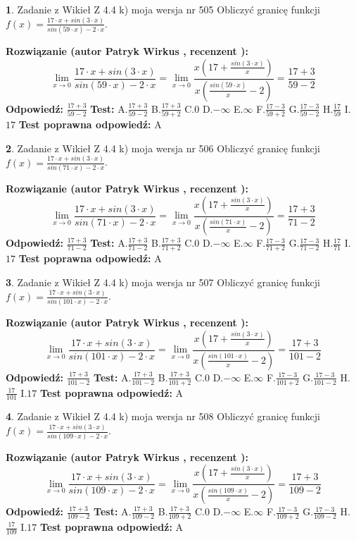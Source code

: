 \documentclass[12pt, a4paper]{article}
\theoremstyle{definition} %
\newtheorem{zad}{}
\newcommand{\zadStart}[1]{\begin{zad}#1\newline}
\newcommand{\zadStop}{\end{zad}}
\newcommand{\rozwStart}[2]{\noindent \textbf{Rozwiązanie (autor #1 , recenzent #2): }\newline}
\newcommand{\rozwStop}{\newline}
\newcommand{\odpStart}{\noindent \textbf{Odpowiedź:}\newline}
\newcommand{\odpStop}{\newline}
\newcommand{\testStart}{\noindent \textbf{Test:}\newline}
\newcommand{\testStop}{\newline}
\newcommand{\kluczStart}{\noindent \textbf{Test poprawna odpowiedź:}\newline}
\newcommand{\kluczStop}{\newline}
\begin{document}
\zadStart{Zadanie z Wikieł Z 4.4 k) moja wersja nr 505}
Obliczyć granicę funkcji $f(x)=\frac{17\cdot x +sin(3\cdot x)}{sin(59\cdot x) -2\cdot x}$.
\zadStop
\rozwStart{Patryk Wirkus}{}
$$\lim\limits_{x\to 0}\frac{17\cdot x +sin(3\cdot x)}{sin(59\cdot x) -2\cdot x}
=\lim\limits_{x\to 0}\frac{x(17+\frac{sin(3\cdot x)}{x})}{x(\frac{sin(59\cdot x)}{x}-2)}
=\frac{17+3}{59-2}$$
\rozwStop
\odpStart
$\frac{17+3}{59-2}$
\odpStop
\testStart
A.$\frac{17+3}{59-2}$
B.$\frac{17+3}{59+2}$
C.$0$
D.$-\infty$
E.$\infty$
F.$\frac{17-3}{59+2}$
G.$\frac{17-3}{59-2}$
H.$\frac{17}{59}$
I.$17$
\testStop
\kluczStart
A
\kluczStop



\zadStart{Zadanie z Wikieł Z 4.4 k) moja wersja nr 506}
Obliczyć granicę funkcji $f(x)=\frac{17\cdot x +sin(3\cdot x)}{sin(71\cdot x) -2\cdot x}$.
\zadStop
\rozwStart{Patryk Wirkus}{}
$$\lim\limits_{x\to 0}\frac{17\cdot x +sin(3\cdot x)}{sin(71\cdot x) -2\cdot x}
=\lim\limits_{x\to 0}\frac{x(17+\frac{sin(3\cdot x)}{x})}{x(\frac{sin(71\cdot x)}{x}-2)}
=\frac{17+3}{71-2}$$
\rozwStop
\odpStart
$\frac{17+3}{71-2}$
\odpStop
\testStart
A.$\frac{17+3}{71-2}$
B.$\frac{17+3}{71+2}$
C.$0$
D.$-\infty$
E.$\infty$
F.$\frac{17-3}{71+2}$
G.$\frac{17-3}{71-2}$
H.$\frac{17}{71}$
I.$17$
\testStop
\kluczStart
A
\kluczStop



\zadStart{Zadanie z Wikieł Z 4.4 k) moja wersja nr 507}
Obliczyć granicę funkcji $f(x)=\frac{17\cdot x +sin(3\cdot x)}{sin(101\cdot x) -2\cdot x}$.
\zadStop
\rozwStart{Patryk Wirkus}{}
$$\lim\limits_{x\to 0}\frac{17\cdot x +sin(3\cdot x)}{sin(101\cdot x) -2\cdot x}
=\lim\limits_{x\to 0}\frac{x(17+\frac{sin(3\cdot x)}{x})}{x(\frac{sin(101\cdot x)}{x}-2)}
=\frac{17+3}{101-2}$$
\rozwStop
\odpStart
$\frac{17+3}{101-2}$
\odpStop
\testStart
A.$\frac{17+3}{101-2}$
B.$\frac{17+3}{101+2}$
C.$0$
D.$-\infty$
E.$\infty$
F.$\frac{17-3}{101+2}$
G.$\frac{17-3}{101-2}$
H.$\frac{17}{101}$
I.$17$
\testStop
\kluczStart
A
\kluczStop



\zadStart{Zadanie z Wikieł Z 4.4 k) moja wersja nr 508}
Obliczyć granicę funkcji $f(x)=\frac{17\cdot x +sin(3\cdot x)}{sin(109\cdot x) -2\cdot x}$.
\zadStop
\rozwStart{Patryk Wirkus}{}
$$\lim\limits_{x\to 0}\frac{17\cdot x +sin(3\cdot x)}{sin(109\cdot x) -2\cdot x}
=\lim\limits_{x\to 0}\frac{x(17+\frac{sin(3\cdot x)}{x})}{x(\frac{sin(109\cdot x)}{x}-2)}
=\frac{17+3}{109-2}$$
\rozwStop
\odpStart
$\frac{17+3}{109-2}$
\odpStop
\testStart
A.$\frac{17+3}{109-2}$
B.$\frac{17+3}{109+2}$
C.$0$
D.$-\infty$
E.$\infty$
F.$\frac{17-3}{109+2}$
G.$\frac{17-3}{109-2}$
H.$\frac{17}{109}$
I.$17$
\testStop
\kluczStart
A
\kluczStop
\end{document}
